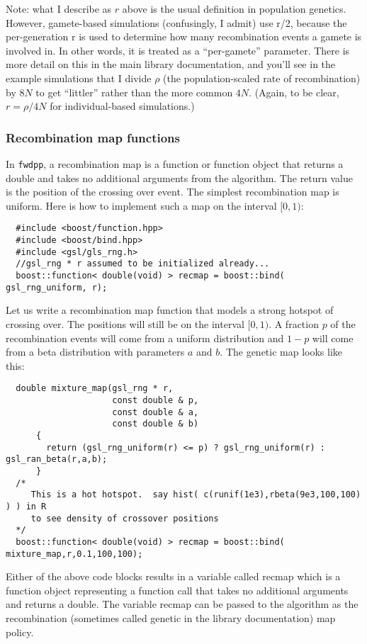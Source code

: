\documentclass{article}
\begin{document}
Note: what I describe as $r$ above is the usual definition in population genetics. However, gamete-based simulations (confusingly, I admit) use r/2, because the per-generation r is used to determine how many recombination events a gamete is involved in.  In other words, it is treated as a ``per-gamete'' parameter.  There is more detail on this in the main library documentation, and you'll see in the example simulations that I divide $\rho$ (the population-scaled rate of recombination) by $8N$ to get ``littler'' rather than the more common $4N$.  (Again, to be clear, $r=\rho/4N$ for individual-based simulations.)

\subsubsection{Recombination map functions}
In \texttt{fwdpp}, a recombination map is a function or function object that returns a double and takes no additional arguments from the algorithm.  The return value is the position of the crossing over event.  The simplest recombination map is uniform.  Here is how to implement such a map on the interval $[0,1)$:

\begin{lstlisting}
  #include <boost/function.hpp>
  #include <boost/bind.hpp>
  #include <gsl/gls_rng.h>
  //gsl_rng * r assumed to be initialized already...
  boost::function< double(void) > recmap = boost::bind( gsl_rng_uniform, r);
\end{lstlisting}

Let us write a recombination map function that models a strong hotspot of crossing over.  The positions will still be on the interval $[0,1)$.  A fraction $p$ of the recombination events will come from a uniform distribution and $1-p$ will come from a beta distribution with parameters $a$ and $b$.  The genetic map looks like this:
\begin{lstlisting}
  double mixture_map(gsl_rng * r, 
                     const double & p,
                     const double & a,
                     const double & b)
      {
        return (gsl_rng_uniform(r) <= p) ? gsl_rng_uniform(r) : gsl_ran_beta(r,a,b);
      }
  /*
     This is a hot hotspot.  say hist( c(runif(1e3),rbeta(9e3,100,100) ) ) in R 
     to see density of crossover positions
  */
  boost::function< double(void) > recmap = boost::bind( mixture_map,r,0.1,100,100);
\end{lstlisting}

Either of the above code blocks results in a variable called recmap which is a function object representing a function call that takes no additional arguments and returns a double.  The variable recmap can be passed to the algorithm as the recombination (sometimes called genetic in the library documentation) map policy.
\end{document}
